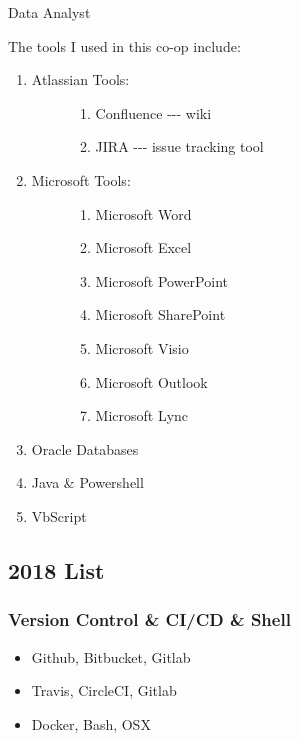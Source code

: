 Data Analyst

The tools I used in this co-op include:

\begin{enumerate}
\def\labelenumi{\arabic{enumi}.}
\item
  \begin{description}
  \item[Atlassian Tools:]
  \begin{enumerate}
  \def\labelenumii{\arabic{enumii}.}
  \tightlist
  \item
    Confluence -\/-\/- wiki
  \item
    JIRA -\/-\/- issue tracking tool
  \end{enumerate}
  \end{description}
\item
  \begin{description}
  \item[Microsoft Tools:]
  \begin{enumerate}
  \def\labelenumii{\arabic{enumii}.}
  \tightlist
  \item
    Microsoft Word
  \item
    Microsoft Excel
  \item
    Microsoft PowerPoint
  \item
    Microsoft SharePoint
  \item
    Microsoft Visio
  \item
    Microsoft Outlook
  \item
    Microsoft Lync
  \end{enumerate}
  \end{description}
\item
  Oracle Databases
\item
  Java \& Powershell
\item
  VbScript
\end{enumerate}


\subsection{2018 List}\label{list}


\subsubsection{Version Control \& CI/CD \&
Shell}\label{version-control-cicd-shell}

\begin{itemize}
\tightlist
\item
  Github, Bitbucket, Gitlab
\item
  Travis, CircleCI, Gitlab
\item
  Docker, Bash, OSX
\end{itemize}



